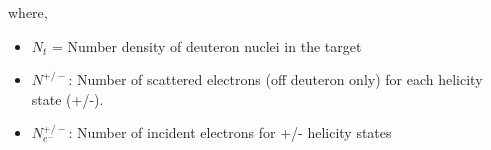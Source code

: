 where, 
\begin{itemize}
  \item $N_t$ = Number density of deuteron nuclei in the target 
  
\begin{comment}  
  \item $N_t$ = Number of deuteron nuclei in the target = $3 N_a l_A \frac{\rho_A}{m_A}$, with 
    \begin{itemize}
      \item 3: number of Deuteron atoms in a \hnd3 molecule
      \item $N_a = 6.02\times 10^{23}$: Avogadro's number
      \item $l_A =$ target length (cm) $\times$ packing fraction
      \item $\rho_A = 1.056 (g/cm^3)$: Target density
      \item $m_A = 21.042414237 (g)$: Mass of target molecule \hnd3   %
    \end{itemize}
\end{comment}
    
  \item $N^{+/-}$: Number of scattered electrons (off deuteron only) for each helicity state (+/-).
  \item $N^{+/-}_{e^-}$: Number of incident electrons for +/- helicity states 
  

\end{itemize}
